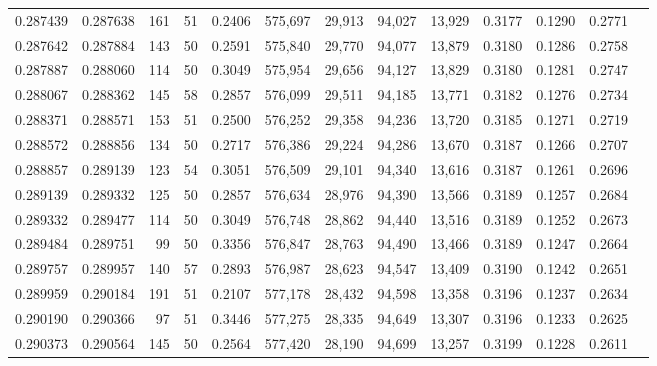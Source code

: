 \begin{tabular}{rrrrrrrrrrrrr}
0.287439 & 0.287638 &   161 &  51 &                                     0.2406 & 575,697 &  29,913 &  94,027 &  13,929 & 0.3177 & 0.1290 & 0.2771 \\
0.287642 & 0.287884 &   143 &  50 &                                     0.2591 & 575,840 &  29,770 &  94,077 &  13,879 & 0.3180 & 0.1286 & 0.2758 \\
0.287887 & 0.288060 &   114 &  50 &                                     0.3049 & 575,954 &  29,656 &  94,127 &  13,829 & 0.3180 & 0.1281 & 0.2747 \\
0.288067 & 0.288362 &   145 &  58 &                                     0.2857 & 576,099 &  29,511 &  94,185 &  13,771 & 0.3182 & 0.1276 & 0.2734 \\
0.288371 & 0.288571 &   153 &  51 &                                     0.2500 & 576,252 &  29,358 &  94,236 &  13,720 & 0.3185 & 0.1271 & 0.2719 \\
0.288572 & 0.288856 &   134 &  50 &                                     0.2717 & 576,386 &  29,224 &  94,286 &  13,670 & 0.3187 & 0.1266 & 0.2707 \\
0.288857 & 0.289139 &   123 &  54 &                                     0.3051 & 576,509 &  29,101 &  94,340 &  13,616 & 0.3187 & 0.1261 & 0.2696 \\
0.289139 & 0.289332 &   125 &  50 &                                     0.2857 & 576,634 &  28,976 &  94,390 &  13,566 & 0.3189 & 0.1257 & 0.2684 \\
0.289332 & 0.289477 &   114 &  50 &                                     0.3049 & 576,748 &  28,862 &  94,440 &  13,516 & 0.3189 & 0.1252 & 0.2673 \\
0.289484 & 0.289751 &    99 &  50 &                                     0.3356 & 576,847 &  28,763 &  94,490 &  13,466 & 0.3189 & 0.1247 & 0.2664 \\
0.289757 & 0.289957 &   140 &  57 &                                     0.2893 & 576,987 &  28,623 &  94,547 &  13,409 & 0.3190 & 0.1242 & 0.2651 \\
0.289959 & 0.290184 &   191 &  51 &                                     0.2107 & 577,178 &  28,432 &  94,598 &  13,358 & 0.3196 & 0.1237 & 0.2634 \\
0.290190 & 0.290366 &    97 &  51 &                                     0.3446 & 577,275 &  28,335 &  94,649 &  13,307 & 0.3196 & 0.1233 & 0.2625 \\
0.290373 & 0.290564 &   145 &  50 &                                     0.2564 & 577,420 &  28,190 &  94,699 &  13,257 & 0.3199 & 0.1228 & 0.2611 \\

\end{tabular}
